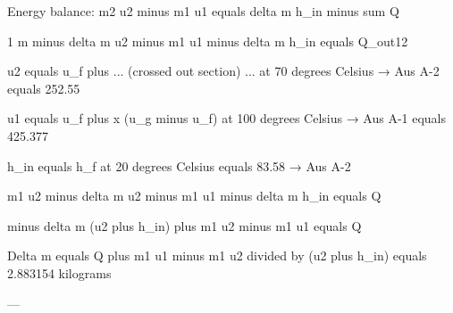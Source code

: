 Energy balance:  
m2 u2 minus m1 u1 equals delta m h_in minus sum Q  

1 m minus delta m u2 minus m1 u1 minus delta m h_in equals Q_out12  

u2 equals u_f plus ... (crossed out section) ... at 70 degrees Celsius → Aus A-2  
equals 252.55  

u1 equals u_f plus x (u_g minus u_f) at 100 degrees Celsius → Aus A-1  
equals 425.377  

h_in equals h_f at 20 degrees Celsius equals 83.58 → Aus A-2  

m1 u2 minus delta m u2 minus m1 u1 minus delta m h_in equals Q  

minus delta m (u2 plus h_in) plus m1 u2 minus m1 u1 equals Q  

Delta m equals Q plus m1 u1 minus m1 u2 divided by (u2 plus h_in)  
equals 2.883154 kilograms  

---